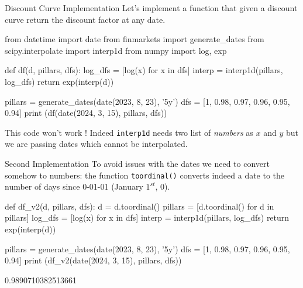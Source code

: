 \documentclass{beamer}
\begin{document}
\begin{frame}[fragile]{Discount Curve Implementation}
Let's implement a function that given a discount curve return the discount factor at any date.
\begin{ipython}
from datetime import date
from finmarkets import generate_dates
from scipy.interpolate import interp1d
from numpy import log, exp

def df(d, pillars, dfs):
    log_dfs = [log(x) for x in dfs]
    interp = interp1d(pillars, log_dfs)
    return exp(interp(d))
    
pillars = generate_dates(date(2023, 8, 23), '5y')
dfs = [1, 0.98, 0.97, 0.96, 0.95, 0.94]
print (df(date(2024, 3, 15), pillars, dfs))
\end{ipython}
This code won't work ! Indeed \texttt{interp1d} needs two list of \emph{numbers} as $x$ and $y$ but we are passing dates which cannot be interpolated.
\end{frame}

\begin{frame}[fragile]{Second Implementation}
To avoid issues with the dates we need to convert somehow to numbers: the function \texttt{toordinal()} converts indeed a date to the number of days since 0-01-01 (January $1^{st}$, 0).
\begin{ipython}
def df_v2(d, pillars, dfs):
    d = d.toordinal()
    pillars = [d.toordinal() for d in pillars]
    log_dfs = [log(x) for x in dfs]
    interp = interp1d(pillars, log_dfs)
    return exp(interp(d))
    
pillars = generate_dates(date(2023, 8, 23), '5y')
dfs = [1, 0.98, 0.97, 0.96, 0.95, 0.94]
print (df_v2(date(2024, 3, 15), pillars, dfs))
\end{ipython}
\begin{ioutput}
0.9890710382513661
\end{ioutput}
\end{frame}
\end{document}
